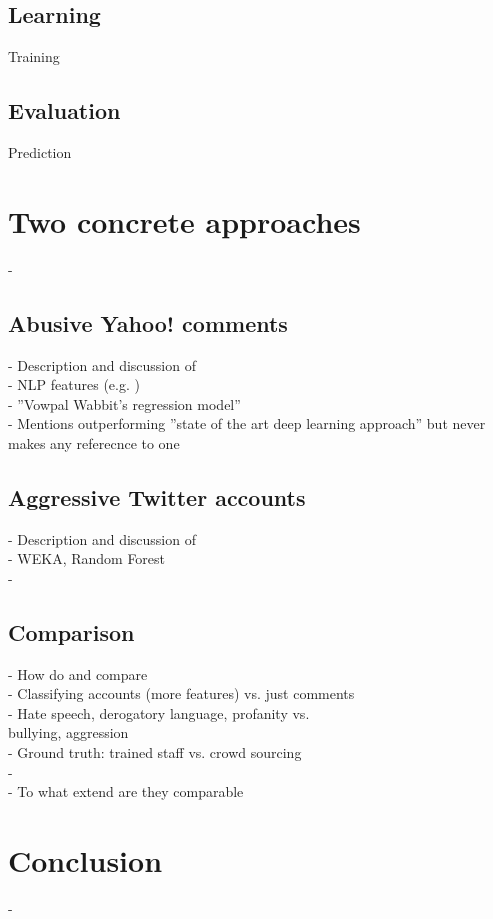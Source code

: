 \documentclass{proseminar}
\begin{document}
\subsection{Learning}
Training

\subsection{Evaluation}
Prediction

\section{Two concrete approaches}
-
\subsection{Abusive Yahoo! comments}
- Description and discussion of \cite{Yahoo:2016}\\
\hphantom{- }- NLP features (e.g. \cite{Distributed:2014})\\
\hphantom{- }- ''Vowpal Wabbit's regression model''\\
\hphantom{- }- Mentions outperforming ''state of the art deep learning approach'' but never makes any referecnce to one
\subsection{Aggressive Twitter accounts}
- Description and discussion of \cite{Twitter:2017}\\
\hphantom{- }- WEKA, Random Forest\\
\hphantom{- }-

\subsection{Comparison}
- How do \cite{Yahoo:2016} and \cite{Twitter:2017} compare\\
\hphantom{- }- Classifying accounts (more features) vs. just comments\\
\hphantom{- }- Hate speech, derogatory language, profanity vs.\\
\hphantom{- - }bullying, aggression\\
\hphantom{- }- Ground truth: trained staff vs. crowd sourcing\\
\hphantom{- }- \\
- To what extend are they comparable

\section{Conclusion}
-
\end{document}
